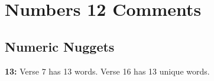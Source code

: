 \section{Numbers 12 Comments}

\subsection{Numeric Nuggets}
\textbf{13: } Verse 7 has 13 words. Verse 16 has 13 unique words.
